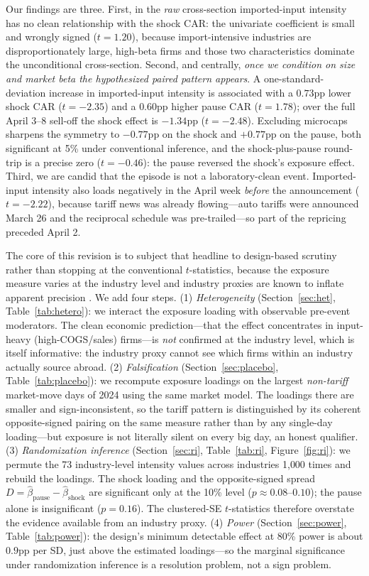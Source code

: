 \documentclass[12pt]{article}
\begin{document}
Our findings are three. First, in the \emph{raw} cross-section imported-input intensity has
no clean relationship with the shock CAR: the univariate coefficient is small and wrongly
signed ($t=1.20$), because import-intensive industries are disproportionately large,
high-beta firms and those two characteristics dominate the unconditional cross-section.
Second, and centrally, \emph{once we condition on size and market beta the hypothesized
paired pattern appears}. A one-standard-deviation increase in imported-input intensity is
associated with a $0.73$pp lower shock CAR ($t=-2.35$) and a $0.60$pp higher pause CAR
($t=1.78$); over the full April 3--8 sell-off the shock effect is $-1.34$pp ($t=-2.48$).
Excluding microcaps sharpens the symmetry to $-0.77$pp on the shock and $+0.77$pp on the
pause, both significant at 5\% under conventional inference, and the shock-plus-pause
round-trip is a precise zero ($t=-0.46$): the pause reversed the shock's exposure effect.
Third, we are candid that the episode is not a laboratory-clean event. Imported-input
intensity also loads negatively in the April week \emph{before} the announcement
($t=-2.22$), because tariff news was already flowing---auto tariffs were announced March 26
and the reciprocal schedule was pre-trailed---so part of the repricing preceded April 2.

The core of this revision is to subject that headline to design-based scrutiny rather than
stopping at the conventional $t$-statistics, because the exposure measure varies at the
industry level and industry proxies are known to inflate apparent precision
\citep{cameron2008,young2019}. We add four steps. (1) \emph{Heterogeneity}
(Section~\ref{sec:het}, Table~\ref{tab:hetero}): we interact the exposure loading with
observable pre-event moderators. The clean economic prediction---that the effect concentrates
in input-heavy (high-COGS/sales) firms---is \emph{not} confirmed at the industry level, which
is itself informative: the industry proxy cannot see which firms within an industry actually
source abroad. (2) \emph{Falsification} (Section~\ref{sec:placebo},
Table~\ref{tab:placebo}): we recompute exposure loadings on the largest \emph{non-tariff}
market-move days of 2024 using the same market model. The loadings there are smaller and
sign-inconsistent, so the tariff pattern is distinguished by its coherent opposite-signed
pairing on the same measure rather than by any single-day loading---but exposure is not
literally silent on every big day, an honest qualifier. (3) \emph{Randomization inference}
(Section~\ref{sec:ri}, Table~\ref{tab:ri}, Figure~\ref{fig:ri}): we permute the 73
industry-level intensity values across industries 1{,}000 times and rebuild the loadings.
The shock loading and the opposite-signed spread $D=\hat\beta_{\text{pause}}-\hat\beta_{\text{shock}}$
are significant only at the 10\% level ($p\approx0.08$--$0.10$); the pause alone is
insignificant ($p=0.16$). The clustered-SE $t$-statistics therefore overstate the evidence
available from an industry proxy. (4) \emph{Power} (Section~\ref{sec:power},
Table~\ref{tab:power}): the design's minimum detectable effect at 80\% power is about $0.9$pp
per SD, just above the estimated loadings---so the marginal significance under randomization
inference is a resolution problem, not a sign problem.
\end{document}
